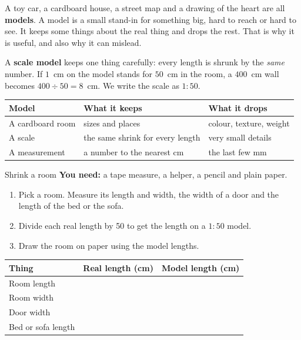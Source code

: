 \label{ch1}

A toy car, a cardboard house, a street map and a drawing of the heart are all \textbf{models}. A model is a small stand-in for something big, hard to reach or hard to see. It keeps some things about the real thing and drops the rest. That is why it is useful, and also why it can mislead.

A \textbf{scale model} keeps one thing carefully: every length is shrunk by the \emph{same} number. If $1$~cm on the model stands for $50$~cm in the room, a $400$~cm wall becomes $400\div50=8$~cm. We write the scale as $1:50$.

\begin{center}
\sffamily\small\renewcommand{\arraystretch}{1.5}
\begin{tabular}{@{}p{3.4cm}p{3.7cm}p{3.7cm}@{}}
\toprule
\textbf{Model} & \textbf{What it keeps} & \textbf{What it drops}\\
\midrule
A cardboard room & sizes and places & colour, texture, weight\\
A scale & the same shrink for every length & very small details\\
A measurement & a number to the nearest cm & the last few mm\\
\bottomrule
\end{tabular}
\end{center}

\begin{tryit}{Shrink a room}
\textbf{You need:} a tape measure, a helper, a pencil and plain paper.
\begin{enumerate}[leftmargin=1.6em]
\item Pick a room. Measure its length and width, the width of a door and the length of the bed or the sofa.
\item Divide each real length by 50 to get the length on a $1:50$ model.
\item Draw the room on paper using the model lengths.
\end{enumerate}
\par\medskip
\renewcommand{\arraystretch}{1.6}
\begin{tabular}{|l|c|c|}
\hline
\textbf{Thing} & \textbf{Real length (cm)} & \textbf{Model length (cm)}\\ \hline
Room length & & \\ \hline
Room width & & \\ \hline
Door width & & \\ \hline
Bed or sofa length & & \\ \hline
\end{tabular}
\end{tryit}

